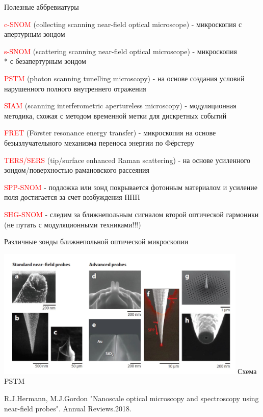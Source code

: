 \documentclass[9pt, compress, xcolor=table]{beamer}
\begin{document}
\begin{frame}{Полезные аббревиатуры}

\colorbox{yellow!30}{\textcolor{red}{c-SNOM} (collecting scanning near-field optical microscope) - микроскопия} \newline \colorbox{yellow!30}{с апертурным зондом}

\colorbox{yellow!30}{\textcolor{red}{s-SNOM} (scattering scanning near-field optical microscope) - микроскопия} \\* \colorbox{yellow!30}{с безапертурным зондом}

\textcolor{red}{PSTM} (photon scanning tunelling microscopy) - на основе создания условий нарушенного полного внутреннего отражения 

\textcolor{red}{SIAM} (scanning interferometric apertureless microscopy) - модуляционная методика, схожая с методом временной метки для дискретных событий

\textcolor{red}{FRET} (F\"orster resonance energy transfer) - микроскопия на основе безызлучательного механизма переноса энергии по Фёрстеру

\textcolor{red}{TERS/SERS} (tip/surface enhanced Raman scattering)
- на основе усиленного зондом/поверхностью рамановского рассеяния

\textcolor{red}{SPP-SNOM} - подложка или зонд покрывается фотонным материалом и усиление поля достигается за счет возбуждения ППП

\textcolor{red}{SHG-SNOM} - следим за ближнепольным сигналом второй оптической гармоники (не путать с модуляционными техниками!!!)


\end{frame}

\begin{frame}{Различные зонды ближнепольной оптической микроскопии}
    \begin{center}
\includegraphics[width=0.9\textwidth]{probes}
\newline Схема PSTM
\end{center}

R.J.Hermann, M.J.Gordon "Nanoscale optical microscopy and spectroscopy using near-field probes". Annual Reviews.2018.
\end{frame}
\end{document}
